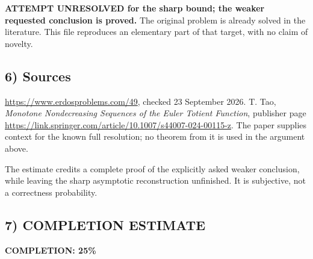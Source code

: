 \textbf{ATTEMPT UNRESOLVED for the sharp bound; the weaker requested conclusion is proved.} The original problem is already solved in the literature. This file reproduces an elementary part of that target, with no claim of novelty.

\subsection*{6) Sources}
\url{https://www.erdosproblems.com/49}, checked 23 September 2026. T. Tao, \emph{Monotone Nondecreasing Sequences of the Euler Totient Function}, publisher page \url{https://link.springer.com/article/10.1007/s44007-024-00115-z}. The paper supplies context for the known full resolution; no theorem from it is used in the argument above.

The estimate credits a complete proof of the explicitly asked weaker conclusion, while leaving the sharp asymptotic reconstruction unfinished. It is subjective, not a correctness probability.
\subsection*{7) COMPLETION ESTIMATE}
\textbf{COMPLETION: 25\%}
